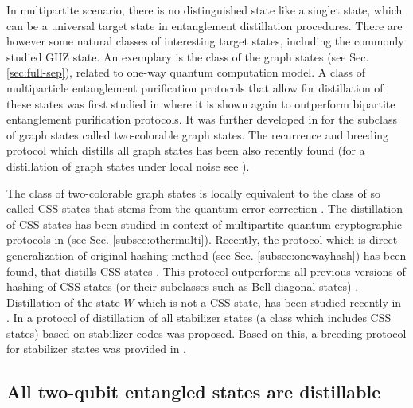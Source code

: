 \documentclass[twocolumn,aps,rmp]{revtex4}
\begin{document}
In multipartite scenario, there is no distinguished state like a
singlet state, which can be a universal target state in entanglement
distillation procedures. There are however some natural classes of
interesting target states, including the commonly studied GHZ
state. An exemplary is the class of the graph states (see
Sec. \ref{sec:full-sep}), related to one-way quantum computation
model. A class of multiparticle entanglement purification protocols
that allow for distillation of these states was first studied in
\cite{DurAB_graf_distill2003} where it is shown again to outperform
bipartite entanglement purification protocols. It was further
developed in \cite{AschauerDurBriegelGraphDistPRA05} for the subclass
of graph states called two-colorable graph states. The recurrence and
breeding protocol which distills all graph states has been also
recently found \cite{KruszynskaMBD_allgrafdist2006} (for a
distillation of graph states under local noise see
\cite{KayPDB_pur_term_gs2006}).

The class of two-colorable graph states is locally equivalent to the
class of so called CSS states that stems from the quantum error
correction \cite{CS-codes,Steane-codes-prl,Steane-codes-prsl}. The
distillation of CSS states has been studied in context of multipartite
quantum cryptographic protocols in \cite{ChenLo_multi_dist} (see
Sec. \ref{subsec:othermulti}).  Recently,
the protocol which is direct
generalization of original hashing method (see
Sec. \ref{subsec:onewayhash}) has been found, that distills CSS states
\cite{HostenesDM_CSSdist2006}.
This protocol outperforms all previous versions of hashing of CSS states (or their subclasses such as Bell diagonal states)
\cite{ManevaS_multi_hash2002,DurAB_graf_distill2003,ChenLo_multi_dist,AschauerDurBriegelGraphDistPRA05}.
Distillation of the state $W$ which is not a CSS state, has been studied recently
in \cite{MiyakeB_Wdist2005}.
In \cite{GlancyKV2006} a protocol of distillation  of all stabilizer states
(a class which includes CSS states) based on stabilizer codes \cite{GottesmanPhd,Nielsen-Chuang} was proposed.
Based on this, a breeding protocol for stabilizer states was provided in \cite{HostensDM2006}.


\subsection{All two-qubit entangled states are distillable}
\label{subsec:two-qubits-distil}
\end{document}
